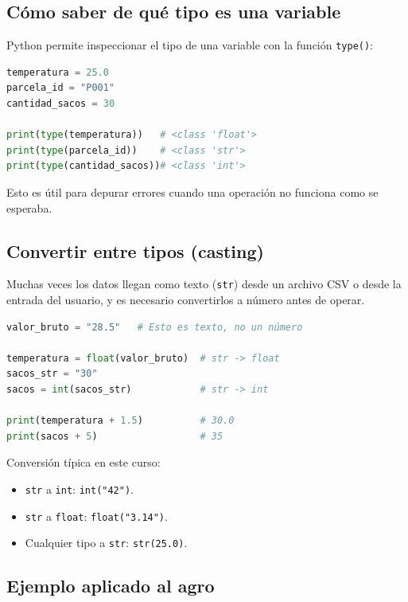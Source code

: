 \documentclass[11pt, a4paper]{article}
\begin{document}
\subsection{Cómo saber de qué tipo es una variable}

Python permite inspeccionar el tipo de una variable con la función \texttt{type()}:

\begin{lstlisting}[language=Python, caption={Inspección de tipos de variables}]
temperatura = 25.0
parcela_id = "P001"
cantidad_sacos = 30

print(type(temperatura))   # <class 'float'>
print(type(parcela_id))    # <class 'str'>
print(type(cantidad_sacos))# <class 'int'>
\end{lstlisting}

Esto es útil para depurar errores cuando una operación no funciona como se esperaba.

\subsection{Convertir entre tipos (casting)}

Muchas veces los datos llegan como texto (\texttt{str}) desde un archivo CSV o desde la entrada del usuario, y es necesario convertirlos a número antes de operar.

\begin{lstlisting}[language=Python, caption={Conversión de tipos}]
valor_bruto = "28.5"   # Esto es texto, no un número

temperatura = float(valor_bruto)  # str -> float
sacos_str = "30"
sacos = int(sacos_str)            # str -> int

print(temperatura + 1.5)          # 30.0
print(sacos + 5)                  # 35
\end{lstlisting}

Conversión típica en este curso:

\begin{itemize}
    \item \texttt{str} a \texttt{int}: \texttt{int("42")}.
    \item \texttt{str} a \texttt{float}: \texttt{float("3.14")}.
    \item Cualquier tipo a \texttt{str}: \texttt{str(25.0)}.
\end{itemize}

\subsection{Ejemplo aplicado al agro}
\end{document}

